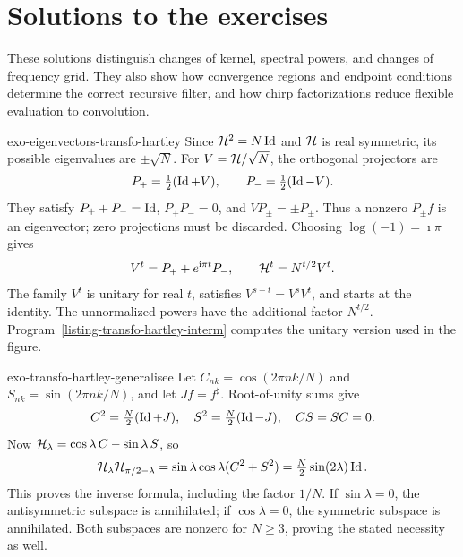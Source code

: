 \clearpage
\section{Solutions to the exercises}
\label{sec-solutions-5-extension}

These solutions distinguish changes of kernel, spectral powers, and changes
of frequency grid. They also show how convergence regions and endpoint
conditions determine the correct recursive filter, and how chirp
factorizations reduce flexible evaluation to convolution.

\begin{correction}{exo-eigenvectors-transfo-hartley}
Since $\mathcal{H}^2=N\operatorname{Id}$ and $\mathcal{H}$ is real symmetric, its possible eigenvalues
are $\pm\sqrt N$. For $V=\mathcal{H}/\sqrt N$, the orthogonal projectors are
\[
 P_+=\tfrac12(\operatorname{Id}+V),\qquad P_-=\tfrac12(\operatorname{Id}-V).
\]
They satisfy $P_++P_-=\operatorname{Id}$, $P_+P_-=0$, and $VP_\pm=\pm P_\pm$.
Thus a nonzero $P_\pm f$ is an eigenvector; zero projections must be
discarded. Choosing $\log(-1)=\imath\pi$ gives
\[
 V^t=P_++e^{\mathrm{i}\pi t}P_-,\qquad
 \mathcal{H}^t=N^{t/2}V^t.
\]
The family $V^t$ is unitary for real $t$, satisfies
$V^{s+t}=V^sV^t$, and starts at the identity. The unnormalized powers have
the additional factor $N^{t/2}$. Program~\ref{listing-transfo-hartley-interm}
computes the unitary version used in the figure.
\begin{listing}[H]
\caption{Unitary fractional powers of the normalized Hartley transform.}
\label{listing-transfo-hartley-interm}
\end{listing}
\end{correction}

\begin{correction}{exo-transfo-hartley-generalisee}
Let $C_{nk}=\cos(2\pi nk/N)$ and $S_{nk}=\sin(2\pi nk/N)$, and let
$Jf=f^\sharp$. Root-of-unity sums give
\[
 C^2=\tfrac N2(\operatorname{Id}+J),\quad S^2=\tfrac N2(\operatorname{Id}-J),\quad CS=SC=0.
\]
Now $\mathcal{H}_\lambda=\cos\lambda\,C-\sin\lambda\,S$, so
\[
 \mathcal{H}_\lambda\mathcal{H}_{\pi/2-\lambda}
 =\sin\lambda\cos\lambda(C^2+S^2)
 =\tfrac N2\sin(2\lambda)\operatorname{Id}.
\]
This proves the inverse formula, including the factor $1/N$. If
$\sin\lambda=0$, the antisymmetric subspace is annihilated; if
$\cos\lambda=0$, the symmetric subspace is annihilated. Both subspaces
are nonzero for $N\geq3$, proving the stated necessity as well.
\end{correction}

